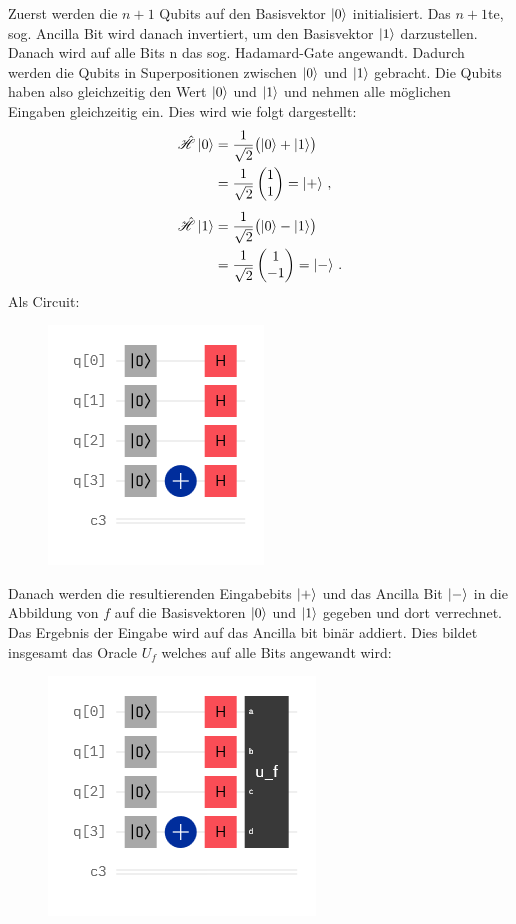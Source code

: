 \documentclass[10pt,aps,prb,twocolumn, nofootinbib]{revtex4-2}
\begin{document}
Zuerst werden die $n+1$ Qubits auf den Basisvektor $\ket{0}$ initialisiert. Das $n+1$te, sog. Ancilla Bit
wird danach invertiert, um den Basisvektor $\ket{1}$ darzustellen. Danach wird auf alle Bits n das sog.
Hadamard-Gate angewandt. Dadurch werden die Qubits in Superpositionen zwischen $\ket{0}$ und $\ket{1}$
gebracht. Die Qubits haben also gleichzeitig den Wert $\ket{0}$ und $\ket{1}$ und nehmen alle m\"oglichen
Eingaben gleichzeitig ein.
Dies wird wie folgt dargestellt:
\begin{align*}
    \hat{\mathscr{H}}\ket{0} &= \frac{1}{\sqrt{2}} \bigl(\ket{0}+\ket{1}\bigr)\\
    &= \frac{1}{\sqrt{2}} \begin{pmatrix}1\\1\end{pmatrix}
    = \ket{+}\,, \\[1ex]
    \hat{\mathscr{H}}\ket{1} &= \frac{1}{\sqrt{2}} \bigl(\ket{0}-\ket{1}\bigr)\\
    &= \frac{1}{\sqrt{2}} \begin{pmatrix}1\\-1\end{pmatrix}
    = \ket{-}\,.
\end{align*}
Als Circuit:
\begin{figure}[h]
    \includegraphics[scale=0.5]{hadamard01}
\end{figure}

Danach werden die resultierenden Eingabebits $\ket{+}$ und das Ancilla Bit $\ket{-}$ in die Abbildung
von $f$ auf die Basisvektoren $\ket{0}$ und $\ket{1}$ gegeben und dort verrechnet. Das Ergebnis der
Eingabe wird auf das Ancilla bit bin\"ar addiert\cite{Deutsch-Jozsa:1}. Dies bildet insgesamt das Oracle
$U_f$ welches auf alle Bits angewandt wird:
\begin{figure}[h]
    \includegraphics[scale=0.5]{U_f}
\end{figure}
\end{document}
